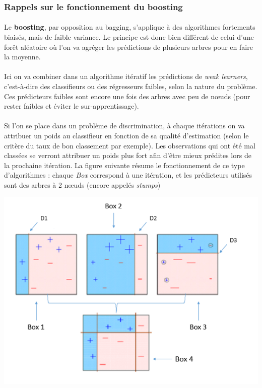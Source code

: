 \documentclass[14pt, openany]{article}
\begin{document}
\subsubsection{Rappels sur le fonctionnement du boosting}
\paragraph{}
Le \textbf{boosting}, par opposition au bagging, s'applique à des algorithmes fortements biaisés, mais de faible variance. Le principe est donc bien différent de celui d'une forêt aléatoire où l'on va agréger les prédictions de plusieurs arbres pour en faire la moyenne.
\paragraph{}
Ici on va combiner dans un algorithme itératif les prédictions de \textit{weak learners}, c'est-à-dire des classifieurs ou des régresseurs faibles, selon la nature du problème. Ces prédicteurs faibles sont encore une fois des arbres avec peu de nœuds (pour rester faibles et éviter le sur-apprentissage). 
\paragraph{}
Si l'on se place dans un problème de discrimination, à chaque itérations on va attribuer un poids au classifieur en fonction de sa qualité d'estimation (selon le critère du taux de bon classement par exemple). Les observations qui ont été mal classées se verront attribuer un poids plus fort afin d'être mieux prédites lors de la prochaine itération. La figure suivante résume le fonctionnement de ce type d'algorithmes : chaque \textit{Box} correspond à une itération, et les prédicteurs utilisés sont des arbres à 2 nœuds (encore appelés \textit{stumps})

\includegraphics[width=19cm]{Images/boosting.png}
\begin{center}
\end{center}
\end{document}
